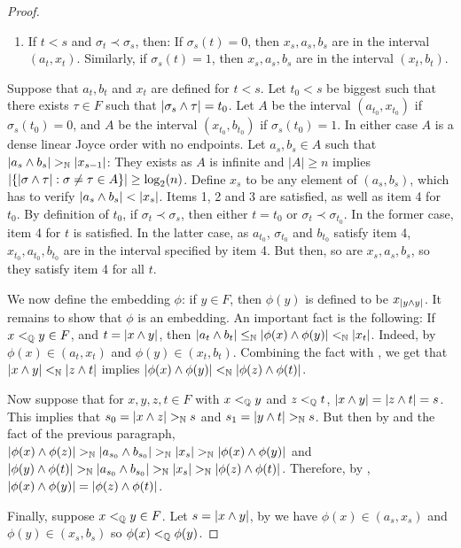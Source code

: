 \begin{proof}
\begin{enumerate}
  \item\label{it:Dev-LaFlamme-4} If $t<s$ and $\sigma_t\prec\sigma_s$, then: If $\sigma_s(t)=0$, then $x_s,a_s,b_s$ are in the interval $(a_t,x_t)$. Similarly, if $\sigma_s(t)=1$, then $x_s,a_s,b_s$ are in the interval $(x_t,b_t)$.
  \end{enumerate}
  Suppose that $a_t,b_t$ and $x_{t}$ are defined for $t<s$. Let $t_0<s$ be biggest such that there exists $\tau\in F$ such that $|\sigma_s\wedge\tau|=t_0$. Let $A$ be the interval $(a_{t_0},x_{t_0})$ if $\sigma_s(t_0)=0$, and $A$ be the interval $(x_{t_0},b_{t_0})$ if $\sigma_s(t_0)=1$. In either case $A$ is a dense linear Joyce order with no endpoints. Let $a_s,b_s\in A$ such that $|a_s\meet b_s|>_\Nb|{x_{s-1}}|$: They exists as $A$ is infinite and $|A|\geq n$ implies $|\{|\sigma\wedge\tau|:\sigma\neq\tau\in A\}|\geq\log_2(n)$. Define $x_s$ to be any element of $(a_s,b_s)$, which has to verify $|a_s\meet b_s|<|x_s|$. Items 1, 2 and 3 are satisfied, as well as item 4 for $t_0$. By definition of $t_0$, if $\sigma_t\prec\sigma_s$, then either $t=t_0$ or $\sigma_t\prec\sigma_{t_0}$. In the former case, item 4 for $t$ is satisfied. In the latter case, as $a_{t_0}$, $\sigma_{t_0}$ and $b_{t_0}$ satisfy item 4, $x_{t_0}, a_{t_0}, b_{t_0}$ are in the interval specified by item 4. But then, so are $x_s, a_s, b_s$, so they satisfy item 4 for all $t$.

  We now define the embedding $\phi$: if $y\in F$, then $\phi(y)$ is defined to be $x_{|y\wedge y|}$. It remains to show that $\phi$ is an embedding. An important fact is the following: If $x<_{\mathbb{Q}} y\in F$, and $t=|x\wedge y|$, then $|a_t\wedge b_t|\leq_{\mathbb{N}}|\phi(x)\wedge\phi(y)|<_{\mathbb{N}}|x_t|$. Indeed, by  $\phi(x)\in(a_t,x_t)$ and $\phi(y)\in(x_t, b_t)$. Combining the fact with , we get that $|x\wedge y|<_{\mathbb{N}}|z\wedge t|$ implies $|\phi(x)\wedge\phi(y)|<_{\mathbb{N}}|\phi(z)\wedge\phi(t)|$.

  Now suppose that for $x,y,z,t\in F$ with $x<_{\mathbb{Q}} y$ and $z<_{\mathbb{Q}} t$, $|x\wedge y|=|z\wedge t|=s$. This implies that $s_0=|x\meet z|>_\Nb s$ and $s_1=|y\meet t|>_\Nb s$. But then by  and the fact of the previous paragraph, $|\phi(x)\meet\phi(z)|>_\Nb|a_{s_0}\meet b_{s_0}|>_\Nb|x_s|>_\Nb|\phi(x)\meet\phi(y)|$ and $|\phi(y)\meet\phi(t)|>_\Nb|a_{s_0}\meet b_{s_0}|>_\Nb|x_s|>_\Nb|\phi(z)\meet\phi(t)|$. Therefore, by , $|\phi(x)\wedge\phi(y)|=|\phi(z)\wedge\phi(t)|$.

  Finally, suppose $x<_{\mathbb{Q}} y\in F$. Let $s=|x\wedge y|$, by  we have $\phi(x)\in (a_s,x_s)$ and $\phi(y)\in(x_s, b_s)$ so $\phi(x)<_{\mathbb{Q}}\phi(y)$.
\end{proof}

